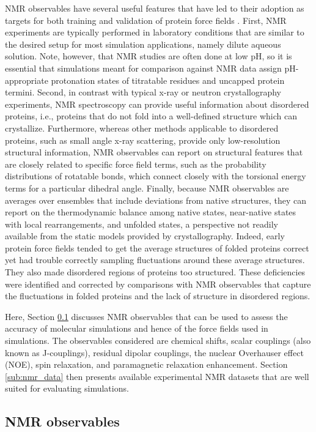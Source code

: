 \documentclass[9pt,review]{livecoms}
\begin{document}
NMR observables have several useful features that have led to their adoption as targets for both training and validation of protein force fields \cite{allison_assessing_2012}.
First, NMR experiments are typically performed in laboratory conditions that are similar to the desired setup for most simulation applications, namely dilute aqueous solution.
Note, however, that NMR studies are often done at low pH, so it is essential that simulations meant for comparison against NMR data assign pH-appropriate protonation states of titratable residues and uncapped protein termini.
Second, in contrast with typical x-ray or neutron crystallography experiments, NMR spectroscopy can provide useful information about disordered proteins, i.e., proteins that do not fold into a well-defined structure which can crystallize.
Furthermore, whereas other methods applicable to disordered proteins, such as small angle x-ray scattering, provide only low-resolution structural information, NMR observables can report on structural features that are closely related to specific force field terms, such as the probability distributions of rotatable bonds, which connect closely with the torsional energy terms for a particular dihedral angle.
Finally, because NMR observables are averages over ensembles that include deviations from native structures, they can report on the thermodynamic balance among native states, near-native states with local rearrangements, and unfolded states, a perspective not readily available from the static models provided by crystallography.
Indeed, early protein force fields tended to get the average structures of folded proteins correct yet had trouble correctly sampling fluctuations around these average structures.
They also made disordered regions of proteins too structured.
These deficiencies were identified and corrected by comparisons with NMR observables that capture the fluctuations in folded proteins and the lack of structure in disordered regions.

Here, Section \ref{sub:nmr_obs} discusses NMR observables that can be used to assess the accuracy of molecular simulations and hence of the force fields used in simulations.
The observables considered are chemical shifts, scalar couplings (also known as J-couplings), residual dipolar couplings, the nuclear Overhauser effect (NOE), spin relaxation, and paramagnetic relaxation enhancement.
Section \ref{sub:nmr_data} then presents available experimental NMR datasets that are well suited for evaluating simulations.

\subsection{NMR observables}
\label{sub:nmr_obs}
\end{document}

